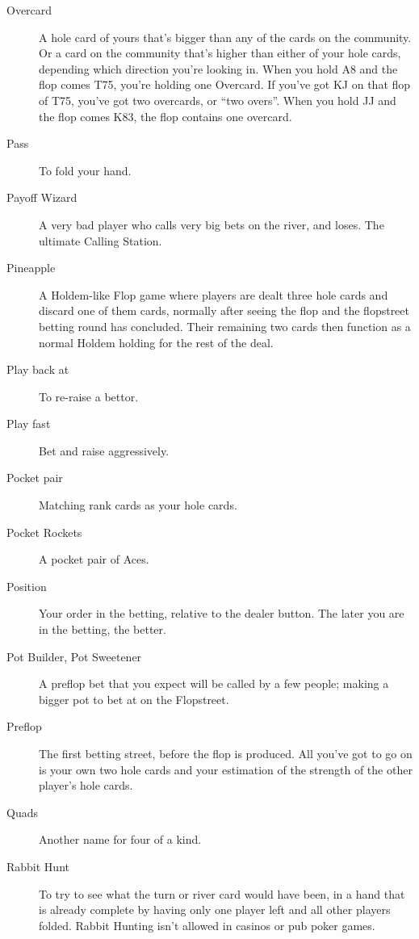 \begin{description}

\item[Overcard] A hole card of yours that's bigger than any of the
cards on the community. Or a card on the community that's higher than
either of your hole cards, depending which direction you're looking
in. When you hold A8 and the flop comes T75, you're holding one
Overcard. If you've got KJ on that flop of T75, you've got two
overcards, or ``two overs''. When you hold JJ and the flop comes K83,
the flop contains one overcard.

\item[Pass] To fold your hand.

\item[Payoff Wizard] A very bad player who calls very big bets on the
river, and loses. The ultimate Calling Station.

\item[Pineapple] A Holdem-like Flop game where players are dealt three
hole cards and discard one of them cards, normally after seeing the
flop and the flopstreet betting round has concluded. Their remaining
two cards then function as a normal Holdem holding for the rest of the
deal.

\item[Play back at] To re-raise a bettor.

\item[Play fast] Bet and raise aggressively.

\item[Pocket pair] Matching rank cards as your hole cards.

\item[Pocket Rockets] A pocket pair of Aces.

\item[Position] Your order in the betting, relative to the dealer
button. The later you are in the betting, the better.

\item[Pot Builder, Pot Sweetener] A preflop bet that you expect will
be called by a few people; making a bigger pot to bet at on the
Flopstreet.

\item[Preflop] The first betting street, before the flop is produced.
All you've got to go on is your own two hole cards and your estimation
of the strength of the other player's hole cards.

\item[Quads] Another name for four of a kind.

\item[Rabbit Hunt] To try to see what the turn or river card would
have been, in a hand that is already complete by having only one
player left and all other players folded. Rabbit Hunting isn't allowed
in casinos or pub poker games.


\end{description}
